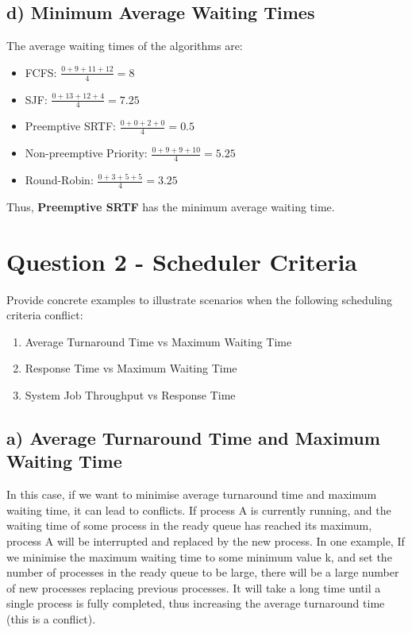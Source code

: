 \documentclass[../main.tex]{subfiles}
\begin{document}
\subsection*{d) Minimum Average Waiting Times}

The average waiting times of the algorithms are:

\begin{itemize}
    \item FCFS: $\frac{0+9+11+12}{4} = 8$
    \item SJF: $\frac{0+13+12+4}{4} = 7.25$
    \item Preemptive SRTF: $\frac{0+0+2+0}{4} = 0.5$
    \item Non-preemptive Priority: $\frac{0+9+9+10}{4} = 5.25$
    \item Round-Robin: $\frac{0+3+5+5}{4} = 3.25$
\end{itemize}

Thus, \textbf{Preemptive SRTF} has the minimum average waiting time.

\newpage

\section{Question 2 - Scheduler Criteria}

Provide concrete examples to illustrate scenarios when the following scheduling criteria conflict:

\begin{enumerate}[label=\alph*)]
    \item Average Turnaround Time vs Maximum Waiting Time
    \item Response Time vs Maximum Waiting Time
    \item System Job Throughput vs Response Time
\end{enumerate}

\solution

\subsection*{a) Average Turnaround Time and Maximum Waiting Time}

In this case, if we want to minimise average turnaround time and maximum waiting time, it can lead to conflicts. If process A is currently running, and the waiting time of some process in the ready queue has reached its maximum, process A will be interrupted and replaced by the new process. 
In one example, If we minimise the maximum waiting time to some minimum value k, and set the number of processes in the ready queue to be large, there will be a large number of new processes replacing previous processes. It will take a long time until a single process is fully completed, thus increasing the average turnaround time (this is a conflict).
\end{document}
